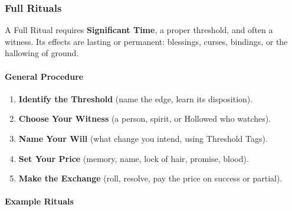 \subsubsection{Full Rituals}

A Full Ritual requires \textbf{Significant Time}, a proper threshold, and often a witness. Its effects are lasting or permanent: blessings, curses, bindings, or the hallowing of ground.

\paragraph{General Procedure}
\begin{enumerate}
    \item \textbf{Identify the Threshold} (name the edge, learn its disposition).
    \item \textbf{Choose Your Witness} (a person, spirit, or Hollowed who watches).
    \item \textbf{Name Your Will} (what change you intend, using Threshold Tags).
    \item \textbf{Set Your Price} (memory, name, lock of hair, promise, blood).
    \item \textbf{Make the Exchange} (roll, resolve, pay the price on success or partial).
\end{enumerate}

\paragraph{Example Rituals}

